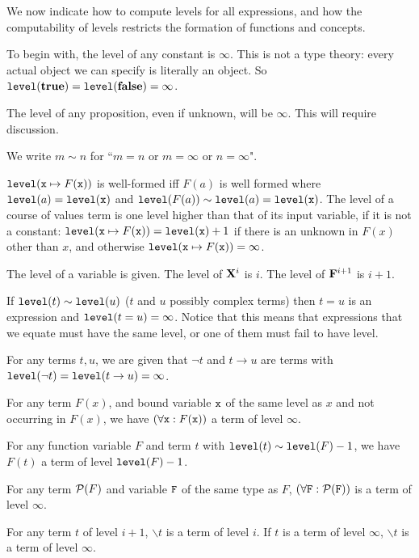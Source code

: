 \documentclass[12pt]{article}
\begin{document}
We now indicate how to compute levels for all expressions, and how the computability of levels restricts the formation of functions and concepts.

To begin with, the level of any constant is $\infty$.  This is not a type theory:  every actual object we can specify is literally an object.  So ${\tt level}({\bf true}) = {\tt level}({\bf false})= \infty$.

The level of any proposition, even if unknown, will be $\infty$.  This will require discussion.

We write $m \sim n$ for ``$m=n$ or $m = \infty$ or $n=\infty$".

${\tt level}({\tt x}\mapsto F({\tt x}))$ is well-formed iff $F(a)$ is well formed where ${\tt level}(a) = {\tt level}({\tt x})$ and ${\tt level}(F(a)) \sim {\tt level}(a) = {\tt level}({\tt x})$.
The level of a course of values term is one level higher than that of its input variable, if it is not a constant:  ${\tt level}({\tt x}\mapsto F({\tt x})) = {\tt level}({\tt x})+1$ if there is an unknown in $F(x)$ other than $x$,
and otherwise ${\tt level}({\tt x}\mapsto F({\tt x})) =\infty$.

The level of a variable is given.  The level of ${\bf X}^i$ is $i$.  The level of ${\bf F}^{i+1}$ is $i+1$.

If ${\tt level}(t) \sim {\tt level}(u)$ ($t$ and $u$ possibly complex terms) then $t=u$ is an expression and ${\tt level}(t=u) = \infty$.  Notice that this means that expressions that we
equate must have the same level, or one of them must fail to have level.

For any terms $t,u$, we are given that $\neg t$ and $t \rightarrow u$ are terms with ${\tt level}(\neg t) = {\tt level}(t \rightarrow u) = \infty$.

For any term $F(x)$, and bound variable ${\tt x}$ of the same level as $x$ and not occurring in $F(x)$, we have $(\forall {\tt x}:F({\tt x}))$ a term of level $\infty$.

For any function variable $F$ and term $t$ with ${\tt level}(t) \sim {\tt level}(F)-1$, we have $F(t)$ a term of level ${\tt level}(F)-1$.

For any term ${\cal P}(F)$ and variable ${\tt F}$ of the same type as $F$, $(\forall {\tt F}:{\cal P}({\tt F}))$ is a term of level $\infty$.

For any term $t$ of level $i+1$, $\backslash t$ is a term of level $i$.  If $t$ is a term of level $\infty$, $\backslash t$ is a term of level $\infty$.
\end{document}
